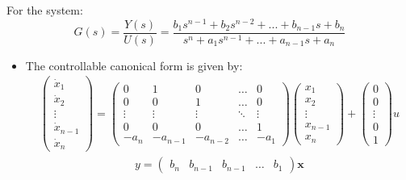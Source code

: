 For the system:
\[ 
G(s) = \frac{Y(s)}{U(s)}=\frac{b_{1} s^{n-1}+b_{2} s^{n-2}+... +b_{n-1}s+b_{n}}{s^{n}+a_{1} s^{n-1}+...+a_{n-1}s+a_{n}} 
\]
\begin{itemize}
    \item The controllable canonical form is given by:
    \begin{gather*}
    \begin{pmatrix}
    \dot{x}_{1}\\
    \dot{x}_{2}\\
    \vdots\\
    \dot{x}_{n-1}\\
    \dot{x}_{n}
    \end{pmatrix} =
    \begin{pmatrix}
    0 & 1 & 0 & \ldots & 0\\
    0 & 0 & 1 & \ldots & 0 \\
    \vdots &\vdots &\vdots  & \ddots & \vdots \\
    0 & 0 & 0 & \ldots & 1\\
    -a_{n} & -a_{n-1} & -a_{n-2} & \ldots & -a_{1}
    \end{pmatrix} 
    \begin{pmatrix}
    {x}_{1}\\
    {x}_{2}\\
    \vdots\\
    {x}_{n-1}\\
    {x}_{n}
    \end{pmatrix}
    +
    \begin{pmatrix}
    0\\
    0\\
    \vdots\\
    0\\
    1
    \end{pmatrix}u
    \end{gather*}
    \begin{gather*}
    y = \begin{pmatrix}
    b_{n}&b_{n-1}&b_{n-1}&\ldots&b_{1}
    \end{pmatrix}
    \mathbf{x}
    \end{gather*}


\end{itemize}
